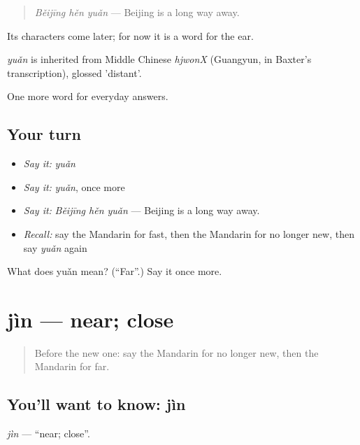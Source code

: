 \begin{quote}
\emph{Běijīng hěn yuǎn} — Beijing is a long way away.
\end{quote}

Its characters come later; for now it is a word for the ear.

\begin{cousinweb}
\emph{yuǎn} is inherited from Middle Chinese \emph{hjwonX} (Guangyun, in Baxter's transcription), glossed 'distant'.
\end{cousinweb}

\begin{grammarlens}[title={What you've built}]
One more word for everyday answers.
\end{grammarlens}

\subsection*{Your turn}
\begin{itemize}
\raggedright
  \item \emph{Say it:} \emph{yuǎn}
  \item \emph{Say it:} \emph{yuǎn}, once more
  \item \emph{Say it:} \emph{Běijīng hěn yuǎn} — Beijing is a long way away.
  \item \emph{Recall:} say the Mandarin for fast, then the Mandarin for no longer new, then say \emph{yuǎn} again
\end{itemize}

\begin{tcolorbox}[breakable,colback=teal!4,colframe=teal!35!black,title={Before you move on}]
What does yuǎn mean? (\textquotedblleft{}Far\textquotedblright{}.) Say it once more.
\end{tcolorbox}
\section[jìn]{jìn — near; close}

\label{lesson:ZH-C62-jin}



\begin{quote}
Before the new one: say the Mandarin for no longer new, then the Mandarin for far.
\end{quote}

\subsection*{You'll want to know: jìn}
\emph{jìn} — \textquotedblleft{}near; close\textquotedblright{}.

